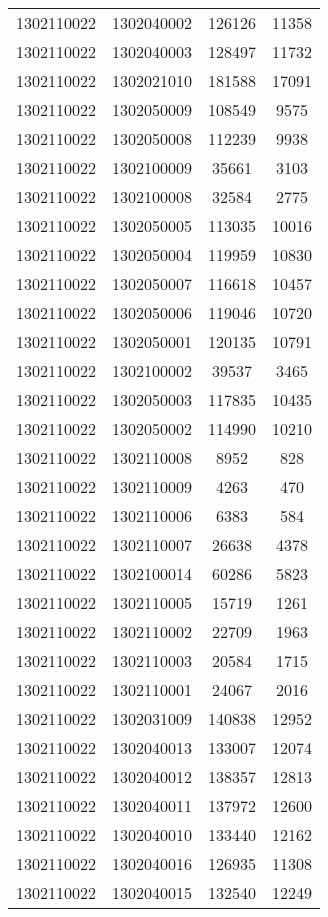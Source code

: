 \begin{longtable}[h]{llcc}
		1302110022 & 1302040002 & 126126 & 11358\\
		1302110022 & 1302040003 & 128497 & 11732\\
		1302110022 & 1302021010 & 181588 & 17091\\
		1302110022 & 1302050009 & 108549 & 9575\\
		1302110022 & 1302050008 & 112239 & 9938\\
		1302110022 & 1302100009 & 35661 & 3103\\
		1302110022 & 1302100008 & 32584 & 2775\\
		1302110022 & 1302050005 & 113035 & 10016\\
		1302110022 & 1302050004 & 119959 & 10830\\
		1302110022 & 1302050007 & 116618 & 10457\\
		1302110022 & 1302050006 & 119046 & 10720\\
		1302110022 & 1302050001 & 120135 & 10791\\
		1302110022 & 1302100002 & 39537 & 3465\\
		1302110022 & 1302050003 & 117835 & 10435\\
		1302110022 & 1302050002 & 114990 & 10210\\
		1302110022 & 1302110008 & 8952 & 828\\
		1302110022 & 1302110009 & 4263 & 470\\
		1302110022 & 1302110006 & 6383 & 584\\
		1302110022 & 1302110007 & 26638 & 4378\\
		1302110022 & 1302100014 & 60286 & 5823\\
		1302110022 & 1302110005 & 15719 & 1261\\
		1302110022 & 1302110002 & 22709 & 1963\\
		1302110022 & 1302110003 & 20584 & 1715\\
		1302110022 & 1302110001 & 24067 & 2016\\
		1302110022 & 1302031009 & 140838 & 12952\\
		1302110022 & 1302040013 & 133007 & 12074\\
		1302110022 & 1302040012 & 138357 & 12813\\
		1302110022 & 1302040011 & 137972 & 12600\\
		1302110022 & 1302040010 & 133440 & 12162\\
		1302110022 & 1302040016 & 126935 & 11308\\
		1302110022 & 1302040015 & 132540 & 12249\\

\end{longtable}
